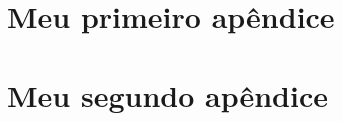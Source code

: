 \chapter{Meu primeiro apêndice}
\label{app:primeiro}

\chapter{Meu segundo apêndice}
\label{app:segundo}
